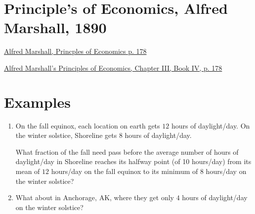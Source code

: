 \documentclass{ximera}
\begin{document}
\section{Principle's of Economics, Alfred Marshall, 1890}

\begin{onlineOnly}
    \begin{center}
\end{center}
\end{onlineOnly}

\href{https://www.desmos.com/calculator/ecy84e5jif}{Alfred Marshall, Princples of Economics p. 178}


\href{https://archive.org/details/principlesofecon01marsrich/page/178/mode/2up}{Alfred Marshall's Principles of Economics, Chapter III, Book IV, p. 178}


\section{Examples}

\begin{question} \label{Q0d0febrgb}
\begin{enumerate}
\item On the fall equinox, each location on earth gets $12$ hours of daylight/day. On the winter solstice, Shoreline gets $8$ hours of daylight/day.

What fraction of the fall need pass before the average number of hours of daylight/day in Shoreline reaches its halfway point (of 10 hours/day) from its mean of $12$ hours/day on the fall equinox to its minimum of $8$ hours/day on the winter solstice?

\item What about in Anchorage, AK, where they get only $4$ hours of daylight/day on the winter solstice?
\end{enumerate}
\end{question}
\end{document}
